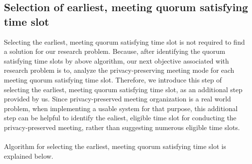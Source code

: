 \documentclass{article}
\begin{document}
\subsection{Selection of earliest, meeting quorum satisfying time slot}
Selecting the earliest, meeting quorum satisfying time slot is not required to find a solution for our research problem. Because, after identifying the quorum satisfying time slots by above algorithm, our next objective associated with research problem is to, analyze the privacy-preserving meeting mode for each meeting quorum satisfying time slot. Therefore, we introduce this step of selecting the earliest, meeting quorum satisfying time slot, as an additional step provided by us. Since privacy-preserved meeting organization is a real world problem, when implementing a usable system for that purpose, this additional step can be helpful to identify the ealiest, eligible time slot for conducting the privacy-preserved meeting, rather than suggesting numerous eligible time slots.\\ \\
Algorithm for selecting the earliest, meeting quorum satisfying time slot is explained below.\\ \\
\end{document}
